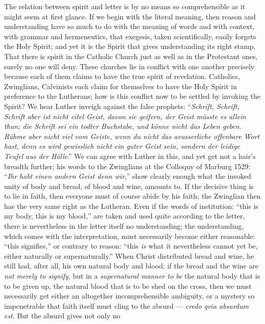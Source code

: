 \documentclass[12pt,a4paper]{article}
\newcommand{\opage}[1]{\marginnote{\footnotesize\textit{[#1]}}}
\begin{document}
The relation between spirit and letter is by no means so
comprehensible as it might seem at first glance. If we begin with
the literal meaning, then reason and understanding have so much
to do with the meaning of words and with context, with grammar and
hermeneutics, that exegesis, taken scientifically, easily forgets the
\opage{21}Holy Spirit; and yet it is the Spirit that gives understanding its
right stamp. That there is spirit in the Catholic Church just as
well as in the Protestant ones, surely no one will deny. These churches
lie in conflict with one another precisely because each of them claims
to have the true spirit of revelation. Catholics, Zwinglians,
Calvinists each claim for themselves to have the Holy Spirit in preference
to the Lutherans; how is this conflict now to be settled by
invoking the Spirit? We hear Luther inveigh against the false prophets:
``\textit{Schrift, Schrift, Schrift aber ist nicht eitel Geist, davon sie geifern,
der Geist müsste es allein thun; die Schrift sei ein todter Buchstabe,
und könne nicht das Leben geben. Rühme aber nicht viel
vom Geiste, wenn du nicht das aeusserliche offenbare Wort hast,
denn es wird gewisslich nicht ein guter Geist sein, sondern der
leidige Teufel aus der Hölle}.'' We can agree with Luther in this,
and yet get not a hair's breadth further; his words to the Zwinglians
at the Colloquy of Marburg 1529: ``\textit{Ihr habt einen andern
Geist denn wir},'' show clearly enough what the invoked unity of
body and bread, of blood and wine, amounts to. If the decisive thing is to lie
in faith, then everyone must of course abide by his faith; the Zwinglian
then has the very same right as the Lutheran. Even if the words
of institution: ``this is my body, this is my blood,'' are taken and used
quite according to the letter, there is nevertheless in the letter itself no
understanding; the understanding, which comes with the interpretation, must necessarily
become either reasonable: ``this signifies,'' or contrary to reason:
``this \emph{is} what it nevertheless cannot yet be, either naturally or
supernaturally.'' When Christ distributed bread and wine, he
still had, after all, his own natural body and blood; if the bread and
the wine are \emph{not merely to signify}, but in a \emph{supernatural manner
to be} the natural body that is to be given up, the natural blood
that is to be shed on the cross, then we must necessarily get either
an altogether incomprehensible ambiguity, or a mystery so
impenetrable that faith itself must cling to the absurd ---
\textit{credo qvia absurdum est}. But the absurd gives not only no
\end{document}
